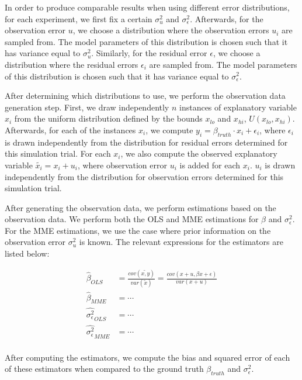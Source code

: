 \documentclass{article}
\begin{document}
In order to produce comparable results when using different error distributions, for each experiment, we first fix a certain $\sigma^2_u$ and $\sigma^2_\epsilon$.
Afterwards, for the observation error $u$, we choose a distribution where the observation errors $u_i$ are sampled from.
The model parameters of this distribution is chosen such that it has variance equal to $\sigma_u^2$.
Similarly, for the residual error $\epsilon$, we choose a distribution where the residual errors $\epsilon_i$ are sampled from.
The model parameters of this distribution is chosen such that it has variance equal to $\sigma_\epsilon^2$.

After determining which distributions to use, we perform the observation data generation step. First, we draw independently $n$ instances of explanatory variable $x_i$ from the uniform distribution defined by the bounds $x_{lo}$ and $x_{hi}$, $U(x_{lo}, x_{hi})$.
Afterwards, for each of the instances $x_i$, we compute $y_i = \beta_{truth} \cdot x_i + \epsilon_i$, where $\epsilon_i$ is drawn independently from the distribution for residual errors determined for this simulation trial.
For each $x_i$, we also compute the observed explanatory variable $\tilde{x_i} = x_i + u_i$, where observation error $u_i$ is added for each $x_i$. $u_i$ is drawn independently from the distribution for observation errors determined for this simulation trial.

After generating the observation data, we perform estimations based on the observation data. We perform both the OLS and MME estimations for $\beta$ and $\sigma_\epsilon^2$. For the MME estimations, we use the case where prior information on the observation error $\sigma_u^2$ is known. The relevant expressions for the estimators are listed below:

\begin{equation}
    \begin{split}
        \hat{\beta}_{OLS} &= \frac{cov(\tilde{x, y})}{var(\tilde{x})} = \frac{cov(x+u, \beta x + \epsilon)}{var(x + u)}\\
        \hat{\beta}_{MME} &= \cdots\\
        \hat{\sigma^2_\epsilon}_{OLS} &= \cdots\\
        \hat{\sigma^2_\epsilon}_{MME} &= \cdots\\
    \end{split}
\end{equation}

After computing the estimators, we compute the bias and squared error of each of these estimators when compared to the ground truth $\beta_{truth}$ and $\sigma^2_\epsilon$. 
\end{document}
